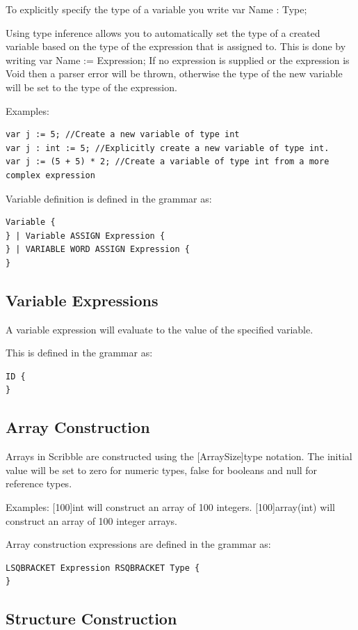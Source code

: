 \documentclass[]{final_report}
\begin{document}
To explicitly specify the type of a variable you write var Name : Type;

Using type inference allows you to automatically set the type of a created variable based on the type of the expression that is assigned to. This is done by writing var Name := Expression; If no expression is supplied or the expression is Void then a parser error will be thrown, otherwise the type of the new variable will be set to the type of the expression.

Examples:
\begin{verbatim}
var j := 5; //Create a new variable of type int
var j : int := 5; //Explicitly create a new variable of type int.
var j := (5 + 5) * 2; //Create a variable of type int from a more complex expression
\end{verbatim}

Variable definition is defined in the grammar as:
\begin{verbatim}
Variable {
} | Variable ASSIGN Expression {
} | VARIABLE WORD ASSIGN Expression {
}
\end{verbatim}

\subsection{Variable Expressions}

A variable expression will evaluate to the value of the specified variable.

This is defined in the grammar as: \begin{verbatim}
ID {
}
\end{verbatim}

\subsection{Array Construction}

Arrays in Scribble are constructed using the [ArraySize]type notation. The initial value will be set to zero for numeric types, false for booleans and null for reference types.

Examples:
[100]int will construct an array of 100 integers.
[100]array(int) will construct an array of 100 integer arrays.

Array construction expressions are defined in the grammar as:
\begin{verbatim}
LSQBRACKET Expression RSQBRACKET Type {
}
\end{verbatim}

\subsection{Structure Construction}
\end{document}

